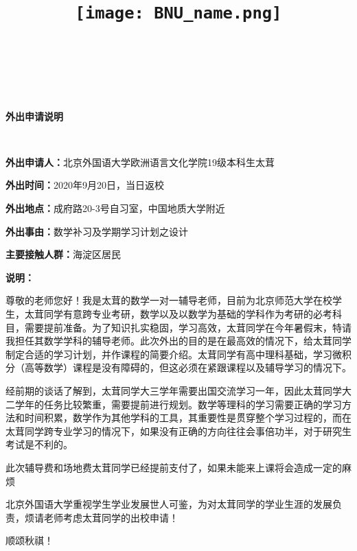 \documentclass[UTF8]{ctexart}
\title{
    \begin{center}
      \texttt{[image: BNU\_name.png]}
    \end{center}
    \vspace{2.5in}
    \Huge{\textbf{\hmwkClass}}\\
    \vspace{1in}
}
\author{\textbf{\hmwkAuthorNameCover}}
\date{}
\newcommand{\hmwkClass}{外出申请说明}
\begin{document}
\maketitle
\pagebreak

\begin{center}
  \huge{\textmd{\textbf{\hmwkClass}}}\\
\end{center}
\\
\par \textbf{外出申请人：}北京外国语大学欧洲语言文化学院19级本科生太茸\\
\par \textbf{外出时间：}2020年9月20日，当日返校\\
\par \textbf{外出地点：}成府路20-3号自习室，中国地质大学附近\\
\par \textbf{外出事由：}数学补习及学期学习计划之设计\\
\par \textbf{主要接触人群：}海淀区居民\\
\par \textbf{说明：}
\par \par 尊敬的老师您好！我是太茸的数学一对一辅导老师，目前为北京师范大学在校学生，太茸同学有意跨专业考研，数学以及以数学为基础的学科作为考研的必考科目，需要提前准备。为了知识扎实稳固，学习高效，太茸同学在今年暑假末，特请我担任其数学学科的辅导老师。此次外出的目的是在最高效的情况下，给太茸同学制定合适的学习计划，并作课程的简要介绍。太茸同学有高中理科基础，学习微积分（高等数学）课程是没有障碍的，但这必须在紧跟课程以及辅导学习的情况下。
\par \par 经前期的谈话了解到，太茸同学大三学年需要出国交流学习一年，因此太茸同学大二学年的任务比较繁重，需要提前进行规划。数学等理科的学习需要正确的学习方法和时间积累，数学作为其他学科的工具，其重要性是贯穿整个学习过程的，而在太茸同学跨专业学习的情况下，如果没有正确的方向往往会事倍功半，对于研究生考试是不利的。
\par \par 此次辅导费和场地费太茸同学已经提前支付了，如果未能来上课将会造成一定的麻烦
\par \par 北京外国语大学重视学生学业发展世人可鉴，为对太茸同学的学业生涯的发展负责，烦请老师考虑太茸同学的出校申请！
\par \par 顺颂秋祺！
\end{document}
